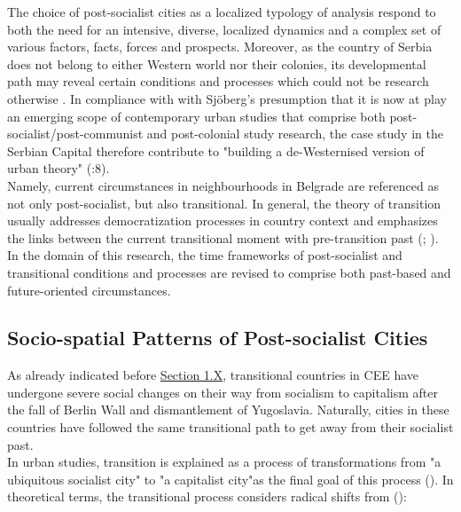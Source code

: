 \documentclass[11pt]{report}
\begin{document}
The choice of post-socialist cities as a localized typology of analysis respond to both the need for an intensive, diverse, localized dynamics and a complex set of various factors, facts, forces and prospects.
Moreover, as the country of Serbia does not belong to either Western world nor their colonies, its developmental path may reveal certain conditions and processes which could not be research otherwise .
In compliance with with Sjöberg's presumption that it is now at play an emerging scope of contemporary urban studies that comprise both post-socialist/post-communist and post-colonial study research, the case study in the Serbian Capital therefore contribute to "building a de-Westernised version of urban theory" (\href{Sjöberg}{\citealt{sjoberg_cases_2014}}:8).
\\

Namely, current circumstances in neighbourhoods in Belgrade are referenced as not only post-socialist, but also transitional.
In general, the theory of transition usually addresses democratization processes in country context and emphasizes the links between the current transitional moment with pre-transition past (\href{Thomas}{\citealt{thomas_thinking_1998}}; \href{Holmes}{\citealt{dryzek_post-communist_2002}}).
In the domain of this research, the time frameworks of post-socialist and transitional conditions and processes are revised to comprise both past-based and future-oriented circumstances.

\subsection{Socio-spatial Patterns of Post-socialist Cities}

As already indicated before \href{(ref introduction section)}{Section 1.X}, transitional countries in CEE have undergone severe social changes on their way from socialism to capitalism after the fall of Berlin Wall and dismantlement of Yugoslavia.
Naturally, cities in these countries have followed the same transitional path to get away from their socialist past.
\\

In urban studies, transition is explained as a process of transformations from "a ubiquitous socialist city" to "a capitalist city"as the final goal of this process (\href{Nenadovic}{\citealt{nedovic-budic_mornings_2011}}).
In theoretical terms, the transitional process considers radical shifts from (\href{Petrovic}{\citealt{petrovic_cities_2009}}): 
\end{document}
